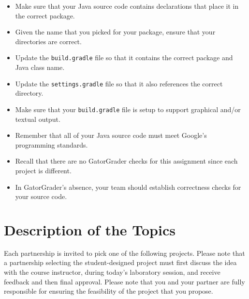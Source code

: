 \documentclass[11pt]{article}
\newcommand{\program}[1]{\lstinline{#1}}
\begin{document}
\begin{itemize}
  \item Make sure that your Java source code contains declarations that place it in the correct package.
  \item Given the name that you picked for your package, ensure that your directories are correct.
  \item Update the \program{build.gradle} file so that it contains the correct package and Java class name.
  \item Update the \program{settings.gradle} file so that it also references the correct directory.
  \item Make sure that your \program{build.gradle} file is setup to support graphical and/or textual output.
  \item Remember that all of your Java source code must meet Google's programming standards.
  \item Recall that there are no GatorGrader checks for this assignment since each project is different.
  \item In GatorGrader's absence, your team should establish correctness checks for your source code.
\end{itemize}

\section*{Description of the Topics}

Each partnership is invited to pick one of the following projects.  Please note that a partnership selecting the
student-designed project must first discuss the idea with the course instructor, during today's laboratory session, and
receive feedback and then final approval. Please note that you and your partner are fully responsible for ensuring the
feasibility of the project that you propose.
\end{document}
